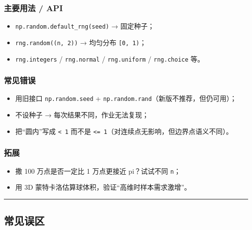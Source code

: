 \subsubsection{主要用法 / API}\label{ux4e3bux8981ux7528ux6cd5-api-2}

\begin{itemize}
\tightlist
\item
  \texttt{np.random.default\_rng(seed)} → 固定种子；
\item
  \texttt{rng.random((n,\ 2))} → 均匀分布 \texttt{{[}0,\ 1)}；
\item
  \texttt{rng.integers} / \texttt{rng.normal} / \texttt{rng.uniform} /
  \texttt{rng.choice} 等。
\end{itemize}

\subsubsection{常见错误}\label{ux5e38ux89c1ux9519ux8bef-2}

\begin{itemize}
\tightlist
\item
  用旧接口 \texttt{np.random.seed} +
  \texttt{np.random.rand}（新版不推荐，但仍可用）；
\item
  不设种子 → 每次结果不同，作业无法复现；
\item
  把``圆内''写成 \texttt{\textless{}\ 1} 而不是
  \texttt{\textless{}=\ 1}（对连续点无影响，但边界点语义不同）。
\end{itemize}

\subsubsection{拓展}\label{ux62d3ux5c55-2}

\begin{itemize}
\tightlist
\item
  撒 100 万点是否一定比 1 万点更接近 pi？试试不同 \texttt{n}；
\item
  用 3D 蒙特卡洛估算球体积，验证``高维时样本需求激增''。
\end{itemize}

\begin{center}\rule{0.5\linewidth}{0.5pt}\end{center}

\subsection{常见误区}\label{ux5e38ux89c1ux8befux533a-1}

